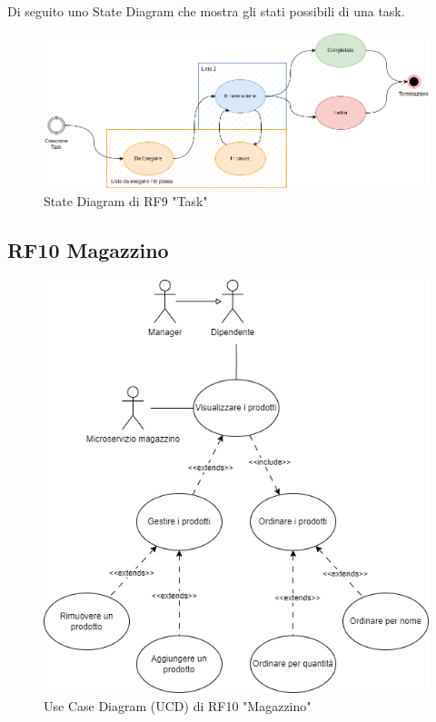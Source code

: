 \documentclass{report}
\begin{document}
Di seguito uno State Diagram che mostra gli stati possibili di una task.
\begin{figure}[H]
	\centering\includegraphics[width=1\textwidth]{images/state_diagram_task.png}
	State Diagram di RF9 "Task"
\end{figure}

\subsection*{RF10 Magazzino}
\begin{figure}[H]
	\centering\includegraphics[width=1\textwidth]{images/UCD/RF10_magazzino_UCD.png}
	Use Case Diagram (UCD) di RF10 "Magazzino"
\end{figure}
\end{document}

